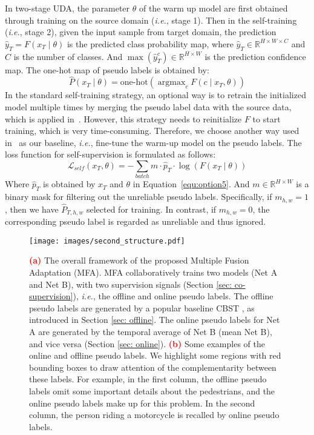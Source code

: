 \documentclass{bmvc2k}
\begin{document}
In two-stage UDA, the parameter $\theta$ of the warm up model are first obtained through training on the source domain (\emph{i.e.}, stage 1). Then in the self-training (\emph{i.e.}, stage 2), given the input sample from target domain, the prediction $\hat{y}_{T} = F\left ( x_{T} \mid \theta\right )$ is the predicted class probability map, where $\hat{y}_{T}\in\mathbb{R}^{H \times W \times C}$  and $C$ is the number of classes. And $\mathop{\max}\left(\hat{y}_{T}^{c}\right)\in\mathbb{R}^{H \times W}$ is the prediction confidence map. The one-hot map of pseudo labels is obtained by:\begin{equation}
\label{equ:option5}
\hat{P}\left ( x_{T} \mid \theta \right )=\text{one-hot}\left(\mathop{\arg\max}_{c}F\left ( c \mid x_{T}, \theta\right)\right)
\end{equation}In the standard self-training strategy, an optional way is to retrain the initialized model multiple times by merging the pseudo label data with the source data, which is applied in~\cite{RN135,RN180}. However, this strategy needs to reinitialize $F$ to start training, which is very time-consuming. Therefore, we choose another way used in~\cite{RN132} as our baseline, \emph{i.e.}, fine-tune the warm-up model on the pseudo labels. The loss function for self-supervision is formulated as follows:\begin{equation}
\label{equ:option2}
\mathcal{L}_{self}(x_{T},\theta) =-\mathop{\sum}_{batch}m \cdot \hat{p}_{T} \cdot \log\left(F\left ( x_{T} \mid\theta\right )\right)
\end{equation}Where $\hat{p}_{T}$ is obtained by $x_{T}$ and  $\theta$ in Equation~\ref{equ:option5}. And $m \in \mathbb{R}^{H \times W}$ is a binary mask for filtering out the unreliable pseudo labels. Specifically, if $m_{h, w}=1$, then we have $\hat{P}_{T, h, w}$ selected for training. In contrast, if $m_{h, w}=0$, the corresponding pseudo label is regarded as unreliable and thus ignored.

\begin{figure}[t]
\centering
\texttt{[image: images/second\_structure.pdf]}
\caption{\textbf{\textcolor{red}{(a)}} The overall framework of the proposed Multiple Fusion Adaptation (MFA). MFA collaboratively trains two models (Net A and Net B), with two supervision signals (Section \ref{sec: co-supervision}), \emph{i.e.}, the offline and online pseudo labels. The offline pseudo labels are generated by a popular baseline CBST \cite{RN162}, as introduced in Section \ref{sec: offline}. The online pseudo labels for Net A are generated by the temporal average of Net B (mean Net B), and vice versa (Section \ref{sec: online}).  \textbf{\textcolor{red}{(b)}} Some examples of the online and offline pseudo labels. 
We highlight some regions with red bounding boxes to draw attention of the complementarity between these labels. For example, in the first column, the offline pseudo labels omit some important details about the pedestrians, and the online pseudo labels make up for this problem. In the second column, the person riding a motorcycle is recalled by online pseudo labels.}
\label{image:learn_step}
\end{figure}
\end{document}
